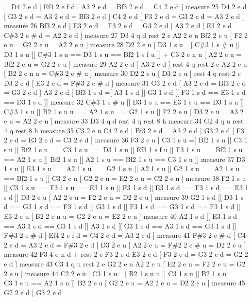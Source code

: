 = D4 2 e d \mbox{]} Ef4 2 e f d \mbox{[} A3 2 e d = Bf3 2 e d = C4 2 e d \mbox{]} measure 25 D4 2 e d \mbox{[} G3 2 e d = A3 2 e d = Bf3 2 e d \mbox{]} C4 2 e d \mbox{[} F3 2 e d = G3 2 e d = A3 2 e d \mbox{]} measure 26 Bf3 2 e d \mbox{[} E3 2 e d = F3 2 e d = G3 2 e d \mbox{]} A3 2 e d \mbox{[} E3 2 e d = C\#3 2 e \# d = A2 2 e d \mbox{]} measure 27 D3 4 q d rest 2 e A2 2 e u Bf2 2 e u \mbox{[} F2 2 e u = G2 2 e u = A2 2 e u \mbox{]} measure 28 D2 2 e u \mbox{[} D3 1 s u =\mbox{[} C\#3 1 s \# u \mbox{]}\mbox{]} D3 1 s u \mbox{[}\mbox{[} C\#3 1 s u == D3 1 s u == Bf2 1 s f u \mbox{]}\mbox{]} + C3 2 e n u \mbox{[} A2 2 e u = Bf2 2 e u = G2 2 e u \mbox{]} measure 29 A2 2 e d \mbox{[} A3 2 e d \mbox{]} rest 4 q rest 2 e A2 2 e u \mbox{[} B2 2 e n u = C\#3 2 e \# u \mbox{]} measure 30 D2 2 e u \mbox{[} D3 2 e u \mbox{]} rest 4 q rest 2 e D3 2 e d \mbox{[} E3 2 e d = F\#3 2 e \# d \mbox{]} measure 31 G3 2 e d \mbox{[} A3 2 e d = Bf3 2 e d = G3 2 e d \mbox{]} A3 2 e d \mbox{[} Bf3 1 s d =\mbox{[} A3 1 s d \mbox{]}\mbox{]} G3 1 s d \mbox{[}\mbox{[} F3 1 s d == E3 1 s d == D3 1 s d \mbox{]}\mbox{]} measure 32 C\#3 1 s \# u \mbox{[}\mbox{[} D3 1 s u == E3 1 s u == D3 1 s u \mbox{]}\mbox{]} C\#3 1 s u \mbox{[}\mbox{[} B2 1 s n u == A2 1 s u == G2 1 s u \mbox{]}\mbox{]} F2 2 e u \mbox{[} D3 2 e u = A3 2 e u = A2 2 e u \mbox{]} measure 33 D3 4 q d rest 4 q rest 8 h measure 34 G2 4 q u rest 4 q rest 8 h measure 35 C3 2 e u C4 2 e d \mbox{[} Bf3 2 e d = A3 2 e d \mbox{]} G3 2 e d \mbox{[} F3 2 e d = E3 2 e d = C3 2 e d \mbox{]} measure 36 F3 2 e u \mbox{[} C3 1 s u =\mbox{[} Bf2 1 s u \mbox{]}\mbox{]} C3 1 s u \mbox{[}\mbox{[} Bf2 1 s u == C3 1 s u == D3 1 s u \mbox{]}\mbox{]} Ef3 1 s f u \mbox{[}\mbox{[} F3 1 s u == Bf2 1 s u == A2 1 s u \mbox{]}\mbox{]} Bf2 1 s u \mbox{[}\mbox{[} A2 1 s u == Bf2 1 s u == C3 1 s u \mbox{]}\mbox{]} measure 37 D3 1 s u \mbox{[}\mbox{[} E3 1 s u == A2 1 s u == G2 1 s u \mbox{]}\mbox{]} A2 1 s u \mbox{[}\mbox{[} G2 1 s u == A2 1 s u == Bf2 1 s u \mbox{]}\mbox{]} C3 2 e u \mbox{[} G2 2 e u = E2 2 e u = C2 2 e u \mbox{]} measure 38 F2 1 s u \mbox{[}\mbox{[} C3 1 s u == F3 1 s u == E3 1 s u \mbox{]}\mbox{]} F3 1 s d \mbox{[}\mbox{[} E3 1 s d == F3 1 s d == E3 1 s d \mbox{]}\mbox{]} D3 2 e u \mbox{[} A2 2 e u = F2 2 e u = D2 2 e u \mbox{]} measure 39 G2 1 s d \mbox{[}\mbox{[} D3 1 s d == G3 1 s d == F3 1 s d \mbox{]}\mbox{]} G3 1 s d \mbox{[}\mbox{[} F3 1 s d == G3 1 s d == F3 1 s d \mbox{]}\mbox{]} E3 2 e u \mbox{[} B2 2 e n u = G2 2 e u = E2 2 e u \mbox{]} measure 40 A2 1 s d \mbox{[}\mbox{[} E3 1 s d == A3 1 s d == G3 1 s d \mbox{]}\mbox{]} A3 1 s d \mbox{[}\mbox{[} G3 1 s d == A3 1 s d == G3 1 s d \mbox{]}\mbox{]} F\#3 2 e \# d \mbox{[} Ef4 2 e f d = C4 2 e d = A3 2 e d \mbox{]} measure 41 F\#3 2 e \# d \mbox{[} C4 2 e d = A3 2 e d = F\#3 2 e d \mbox{]} D3 2 e u \mbox{[} A2 2 e u = F\#2 2 e \# u = D2 2 e u \mbox{]} measure 42 F3 4 q n d + rest 2 e F3 2 e d E3 2 e d \mbox{[} F3 2 e d = G3 2 e d = G2 2 e d \mbox{]} measure 43 C3 4 q u rest 2 e G2 2 e u A2 2 e u \mbox{[} E2 2 e u = F2 2 e u = G2 2 e u \mbox{]} measure 44 C2 2 e u \mbox{[} C3 1 s u =\mbox{[} B2 1 s n u \mbox{]}\mbox{]} C3 1 s u \mbox{[}\mbox{[} B2 1 s u == C3 1 s u == A2 1 s u \mbox{]}\mbox{]} B2 2 e u \mbox{[} G2 2 e u = A2 2 e u = D2 2 e u \mbox{]} measure 45 G2 2 e d \mbox{[} G3 2 e d 